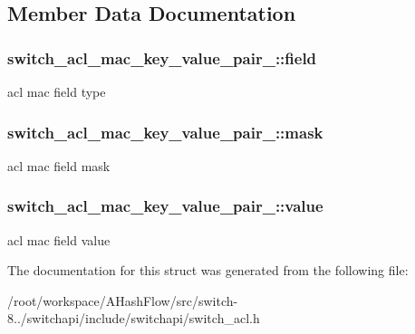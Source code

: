 \subsection{Member Data Documentation}
\hypertarget{structswitch__acl__mac__key__value__pair___a5862e9e68687060562247eb562b0ec40}{
\subsubsection[{field}]{ switch\+\_\+acl\+\_\+mac\+\_\+key\+\_\+value\+\_\+pair\+\_\+\+::field}}\label{structswitch__acl__mac__key__value__pair___a5862e9e68687060562247eb562b0ec40}
acl mac field type \hypertarget{structswitch__acl__mac__key__value__pair___a3764ff0ea3fdc45e22d435e2797b92ed}{
\subsubsection[{mask}]{ switch\+\_\+acl\+\_\+mac\+\_\+key\+\_\+value\+\_\+pair\+\_\+\+::mask}}\label{structswitch__acl__mac__key__value__pair___a3764ff0ea3fdc45e22d435e2797b92ed}
acl mac field mask \hypertarget{structswitch__acl__mac__key__value__pair___abebce0f3e7313b252726036acdd46561}{
\subsubsection[{value}]{ switch\+\_\+acl\+\_\+mac\+\_\+key\+\_\+value\+\_\+pair\+\_\+\+::value}}\label{structswitch__acl__mac__key__value__pair___abebce0f3e7313b252726036acdd46561}
acl mac field value 

The documentation for this struct was generated from the following file\+:\begin{DoxyCompactItemize}
\item 
/root/workspace/\+A\+Hash\+Flow/src/switch-\/8../switchapi/include/switchapi/switch\+\_\+acl.\+h\end{DoxyCompactItemize}
